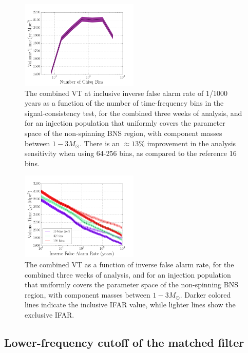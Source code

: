 \begin{figure}
\includegraphics[width=0.5\textwidth]{papers/bns_o1_dev/figures/cb.png}
\caption{\label{fig:vbin} 
The combined VT at inclusive inverse false alarm rate of 1/1000 years as a function of the number of time-frequency bins in the signal-consistency test, for the combined three weeks of analysis, and for an injection population that uniformly covers the parameter space of the non-spinning BNS region, with component masses between $1- 3M_\odot$. There is an $\approx 13\% $ improvement in the analysis sensitivity when using 64-256 bins, as compared to the reference 16 bins.
}
\end{figure}

\begin{figure}
\includegraphics[width=0.5\textwidth]{papers/bns_o1_dev/figures/chisq_combined.png}
\caption{\label{fig:fchisq} 
The combined VT as a function of inverse false alarm rate, for the combined three weeks of analysis, and for an injection population that uniformly covers the parameter space of the non-spinning BNS region, with component masses between $1- 3M_\odot$. Darker colored lines indicate the inclusive IFAR value, while lighter lines show the exclusive IFAR. 
}
\end{figure}

\subsection{Lower-frequency cutoff of the matched filter}

